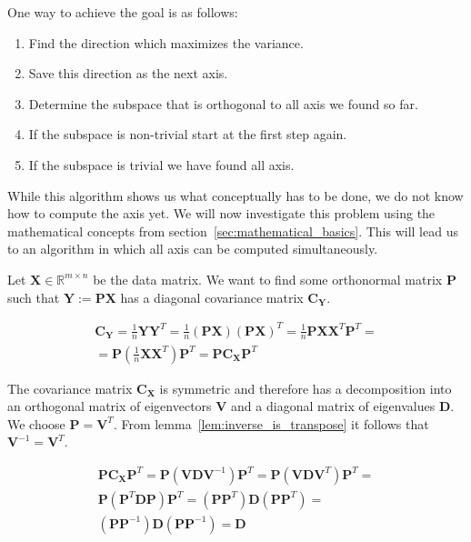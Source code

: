 \documentclass[a4paper]{IEEEtran}
\begin{document}
One way to achieve the goal is as follows:
\begin{enumerate}
	\item Find the direction which maximizes the variance.
	\item Save this direction as the next axis.
	\item Determine the subspace that is orthogonal to all axis we found so far.
	\item If the subspace is non-trivial start at the first step again.
	\item If the subspace is trivial we have found all axis.
\end{enumerate}

While this algorithm shows us what conceptually has to be done, we do not know how to compute the axis yet. We will now investigate this problem using the mathematical concepts from section~\ref{sec:mathematical_basics}. This will lead us to an algorithm in which all axis can be computed simultaneously.

Let $\mathbf{X} \in \mathbb{R}^{m\times n}$ be the data matrix. We want to find some orthonormal matrix $\mathbf{P}$ such that $\mathbf{Y}:=\mathbf{PX}$ has a diagonal covariance matrix $\mathbf{C}_{\mathbf{Y}}$.

\begin{align*}
	\mathbf{C}_{\mathbf{Y}} = \frac{1}{n}\mathbf{YY}^T = \frac{1}{n}(\mathbf{PX})(\mathbf{PX})^T = \frac{1}{n}\mathbf{PX}\mathbf{X}^T\mathbf{P}^T =\\
	= \mathbf{P}(\frac{1}{n}\mathbf{X}\mathbf{X}^T)\mathbf{P}^T = \mathbf{P}\mathbf{C}_\mathbf{X}\mathbf{P}^T
\end{align*}

The covariance matrix $\mathbf{C}_\mathbf{X}$ is symmetric and therefore has a decomposition into an orthogonal matrix of eigenvectors $\mathbf{V}$ and a diagonal matrix of eigenvalues $\mathbf{D}$. We choose $\mathbf{P}=\mathbf{V}^T$. From lemma~\ref{lem:inverse_is_transpose} it follows that $\mathbf{V}^{-1} = \mathbf{V}^T$.

\begin{align*}
	\mathbf{P}\mathbf{C}_\mathbf{X}\mathbf{P}^T = \mathbf{P}(\mathbf{VDV}^{-1})\mathbf{P}^T = \mathbf{P}(\mathbf{VDV}^{T})\mathbf{P}^T =\\
	\mathbf{P}(\mathbf{P}^T\mathbf{DP})\mathbf{P}^T = (\mathbf{P}\mathbf{P}^T)\mathbf{D}(\mathbf{P}\mathbf{P}^T) =\\
	(\mathbf{P}\mathbf{P}^{-1})\mathbf{D}(\mathbf{P}\mathbf{P}^{-1}) = \mathbf{D}
\end{align*}
\end{document}
